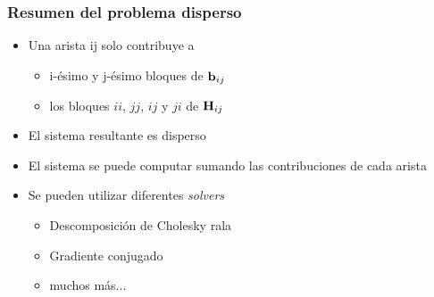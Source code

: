 \begin{frame}
    \frametitle{Resumen del problema disperso}
    
    \begin{itemize}
        \item Una arista ij solo contribuye a
        \begin{itemize}
            \item i-ésimo y j-ésimo bloques de $\boldsymbol{\mathbf{b}}_{ij}$
            \item los bloques $ii$, $jj$, $ij$ y $ji$ de $\boldsymbol{\mathbf{H}}_{ij}$
        \end{itemize}
        \item El sistema resultante es disperso
        \item El sistema se puede computar sumando las contribuciones de cada arista
        \item Se pueden utilizar diferentes \emph{solvers}
        \begin{itemize}
            \item Descomposición de Cholesky rala
            \item Gradiente conjugado
            \item muchos más...
        \end{itemize}

    \end{itemize}
    
    
\end{frame}


